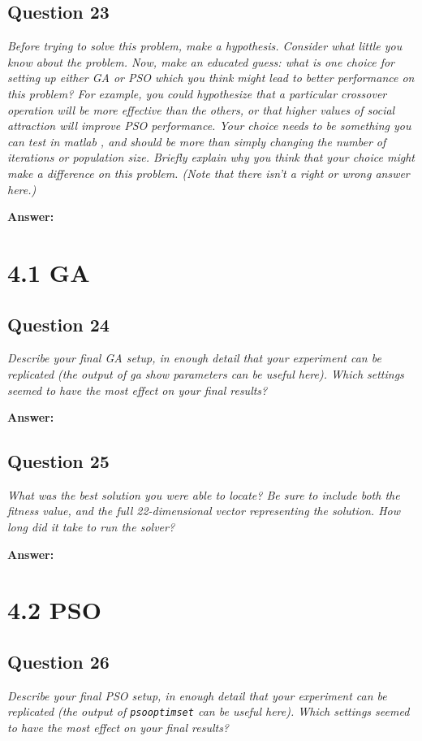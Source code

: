 \documentclass[a4paper]{article}
\begin{document}
\subsection*{Question 23}
\emph{Before trying to solve this problem, make a hypothesis. Consider what little you know about the problem. Now, make an educated guess: what is one choice for setting up either GA or PSO which you think might lead to better performance on this problem? For example, you could hypothesize that a particular crossover operation will be more effective than the others, or that higher values of social attraction will improve PSO performance. Your choice needs to be something you can test in matlab , and should be more than simply changing the number of iterations or population size. Briefly explain why you
think that your choice might make a difference on this problem. (Note that there isn’t a right or wrong answer here.)}

\textbf{Answer:}

\section*{4.1 GA}

\subsection*{Question 24}
\emph{Describe your final GA setup, in enough detail that your experiment can be replicated (the output of ga show parameters can be useful here). Which settings seemed to have the most effect on your final results?}

\textbf{Answer:}

\subsection*{Question 25}
\emph{What was the best solution you were able to locate? Be sure to
include both the fitness value, and the full 22-dimensional vector representing
the solution. How long did it take to run the solver?}

\textbf{Answer:}

\section*{4.2 PSO}

\subsection*{Question 26}
\emph{Describe your final PSO setup, in enough detail that your experiment can be replicated (the output of \texttt{psooptimset} can be useful here). Which settings seemed to have the most effect on your final results?}
\end{document}
